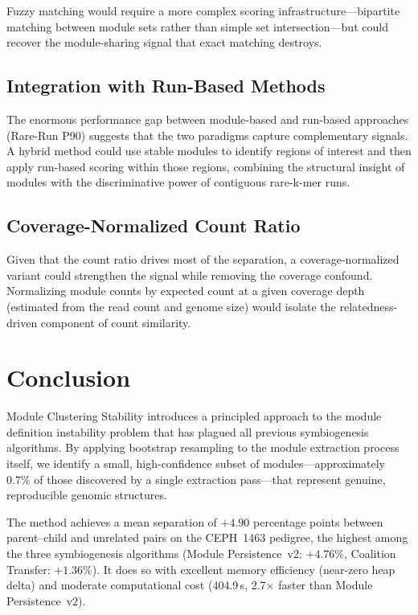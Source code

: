 \documentclass{../yalumba}
\begin{document}
Fuzzy matching would require a more complex scoring infrastructure---bipartite
matching between module sets rather than simple set intersection---but could
recover the module-sharing signal that exact matching destroys.

\subsection{Integration with Run-Based Methods}

The enormous performance gap between module-based and run-based approaches
(Rare-Run P90) suggests that the two paradigms capture complementary signals.
A hybrid method could use stable modules to identify regions of interest and
then apply run-based scoring within those regions, combining the structural
insight of modules with the discriminative power of contiguous rare-k-mer runs.

\subsection{Coverage-Normalized Count Ratio}

Given that the count ratio drives most of the separation, a coverage-normalized
variant could strengthen the signal while removing the coverage confound.
Normalizing module counts by expected count at a given coverage depth (estimated
from the read count and genome size) would isolate the relatedness-driven
component of count similarity.


\section{Conclusion}
\label{sec:conclusion}

Module Clustering Stability introduces a principled approach to the module
definition instability problem that has plagued all previous symbiogenesis
algorithms.  By applying bootstrap resampling to the module extraction process
itself, we identify a small, high-confidence subset of modules---approximately
0.7\% of those discovered by a single extraction pass---that represent genuine,
reproducible genomic structures.


The method achieves a mean separation of $+4.90$ percentage points between
parent--child and unrelated pairs on the CEPH~1463 pedigree, the highest among
the three symbiogenesis algorithms (Module Persistence~v2: $+4.76\%$, Coalition
Transfer: $+1.36\%$).  It does so with excellent memory efficiency (near-zero
heap delta) and moderate computational cost (404.9\,s, 2.7$\times$ faster than
Module Persistence~v2).
\end{document}
